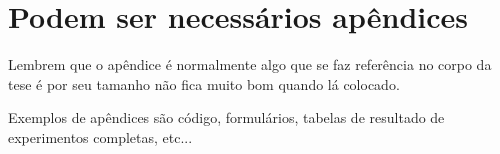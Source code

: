 \chapter{Podem ser necessários apêndices}

Lembrem que o apêndice é normalmente algo que se faz referência no corpo da tese é por seu tamanho não fica muito bom quando lá colocado.

Exemplos de apêndices são código, formulários, tabelas de resultado de experimentos completas, etc...

